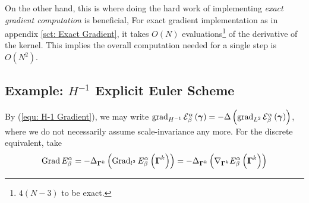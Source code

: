 \documentclass[../dissertation.tex]{subfiles}
\begin{document}
On the other hand, this is where doing the hard work of implementing \textit{exact gradient computation} is beneficial,
For exact gradient implementation as in appendix \ref{sct: Exact Gradient},
it takes $O \left( N \right)$ evaluations\footnote{$4 \left( N-3 \right)$ to be exact.} of the derivative of the kernel.
This implies the overall computation needed for a single step is $O \left( N^2 \right)$.

\subsection{Example: $H^{-1}$ Explicit Euler Scheme}
By (\ref{equ: H-1 Gradient}), we may write $\operatorname{grad}_{H^{-1}} \mathcal{E}_{\beta}^{\alpha} \left( \boldsymbol{\gamma} \right) = - \Delta \left( \operatorname{grad}_{L^2} \mathcal{E}_{\beta}^{\alpha} \left( \boldsymbol{\gamma} \right)\right)$,
where we do not necessarily assume scale-invariance any more.
For the discrete equivalent, take
\begin{equation}
    \operatorname{Grad} E_{\beta}^{\alpha} = - \Delta_{\boldsymbol{\Gamma}^k} \left( \operatorname{Grad}_{l^2} E_{\beta}^{\alpha} \left( \boldsymbol{\Gamma}^k \right) \right) = - \Delta_{\boldsymbol{\Gamma}^k} \left( \nabla_{\boldsymbol{\Gamma}^k} E_{\beta}^{\alpha} \left( \boldsymbol{\Gamma}^k \right) \right)
\end{equation}


\end{document}

